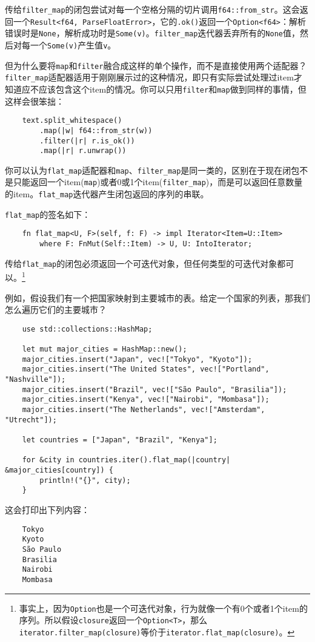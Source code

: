 传给\texttt{filter\_map}的闭包尝试对每一个空格分隔的切片调用\texttt{f64::from\_str}。这会返回一个\texttt{Result<f64, ParseFloatError>}，它的\texttt{.ok()}返回一个\texttt{Option<f64>}：解析错误时是\texttt{None}，解析成功时是\texttt{Some(v)}。\texttt{filter\_map}迭代器丢弃所有的\texttt{None}值，然后对每一个\texttt{Some(v)}产生值\texttt{v}。

但为什么要将\texttt{map}和\texttt{filter}融合成这样的单个操作，而不是直接使用两个适配器？\texttt{filter\_map}适配器适用于刚刚展示过的这种情况，即只有实际尝试处理过item才知道应不应该包含这个item的情况。你可以只用\texttt{filter}和\texttt{map}做到同样的事情，但这样会很笨拙：
\begin{verbatim}
    text.split_whitespace()
        .map(|w| f64::from_str(w))
        .filter(|r| r.is_ok())
        .map(|r| r.unwrap())
\end{verbatim}

你可以认为\texttt{flat\_map}适配器和\texttt{map}、\texttt{filter\_map}是同一类的，区别在于现在闭包不是只能返回一个item(\texttt{map})或者0或1个item(\texttt{filter\_map})，而是可以返回任意数量的item。\texttt{flat\_map}迭代器产生闭包返回的序列的串联。

\texttt{flat\_map}的签名如下：
\begin{verbatim}
    fn flat_map<U, F>(self, f: F) -> impl Iterator<Item=U::Item>
        where F: FnMut(Self::Item) -> U, U: IntoIterator;
\end{verbatim}
传给\texttt{flat\_map}的闭包必须返回一个可迭代对象，但任何类型的可迭代对象都可以。\footnote{事实上，因为\texttt{Option}也是一个可迭代对象，行为就像一个有0个或者1个item的序列。所以假设\texttt{closure}返回一个\texttt{Option<T>}，那么\texttt{iterator.filter\_map(closure)}等价于\texttt{iterator.flat\_map(closure)}。}

例如，假设我们有一个把国家映射到主要城市的表。给定一个国家的列表，那我们怎么遍历它们的主要城市？
\begin{verbatim}
    use std::collections::HashMap;

    let mut major_cities = HashMap::new();
    major_cities.insert("Japan", vec!["Tokyo", "Kyoto"]);
    major_cities.insert("The United States", vec!["Portland", "Nashville"]);
    major_cities.insert("Brazil", vec!["São Paulo", "Brasilia"]);
    major_cities.insert("Kenya", vec!["Nairobi", "Mombasa"]);
    major_cities.insert("The Netherlands", vec!["Amsterdam", "Utrecht"]);

    let countries = ["Japan", "Brazil", "Kenya"];

    for &city in countries.iter().flat_map(|country| &major_cities[country]) {
        println!("{}", city);
    }
\end{verbatim}
这会打印出下列内容：
\begin{verbatim}
    Tokyo
    Kyoto
    São Paulo
    Brasilia
    Nairobi
    Mombasa
\end{verbatim}


